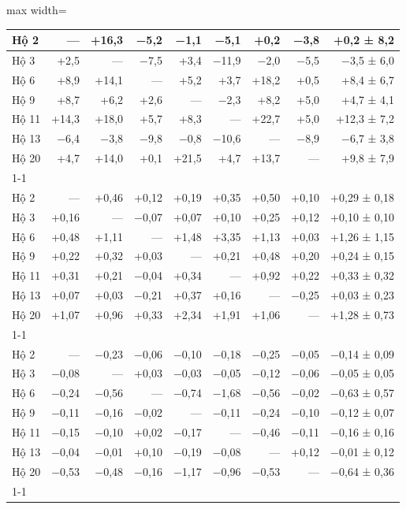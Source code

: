 \begin{table}[H]
\begin{adjustbox}{max width=\linewidth}
\begin{tabular}{|l|r|r|r|r|r|r|r|r|}
Hộ 2 & — & +16,3 & −5,2 & −1,1 & −5,1 & +0,2 & −3,8 & +0,2 ± 8,2 \\ \hline
Hộ 3 & +2,5 & — & −7,5 & +3,4 & −11,9 & −2,0 & −5,5 & −3,5 ± 6,0 \\ \hline
Hộ 6 & +8,9 & +14,1 & — & +5,2 & +3,7 & +18,2 & +0,5 & +8,4 ± 6,7 \\ \hline
Hộ 9 & +8,7 & +6,2 & +2,6 & — & −2,3 & +8,2 & +5,0 & +4,7 ± 4,1 \\ \hline
Hộ 11 & +14,3 & +18,0 & +5,7 & +8,3 & — & +22,7 & +5,0 & +12,3 ± 7,2 \\ \hline
Hộ 13 & −6,4 & −3,8 & −9,8 & −0,8 & −10,6 & — & −8,9 & −6,7 ± 3,8 \\ \hline
Hộ 20 & +4,7 & +14,0 & +0,1 & +21,5 & +4,7 & +13,7 & — & +9,8 ± 7,9 \\ \cline{1-1}
\multicolumn{9}{|l|}{\textbf{NEP ↓}} \\ \hline
Hộ 2 & — & +0,46 & +0,12 & +0,19 & +0,35 & +0,50 & +0,10 & +0,29 ± 0,18 \\ \hline
Hộ 3 & +0,16 & — & −0,07 & +0,07 & +0,10 & +0,25 & +0,12 & +0,10 ± 0,10 \\ \hline
Hộ 6 & +0,48 & +1,11 & — & +1,48 & +3,35 & +1,13 & +0,03 & +1,26 ± 1,15 \\ \hline
Hộ 9 & +0,22 & +0,32 & +0,03 & — & +0,21 & +0,48 & +0,20 & +0,24 ± 0,15 \\ \hline
Hộ 11 & +0,31 & +0,21 & −0,04 & +0,34 & — & +0,92 & +0,22 & +0,33 ± 0,32 \\ \hline
Hộ 13 & +0,07 & +0,03 & −0,21 & +0,37 & +0,16 & — & −0,25 & +0,03 ± 0,23 \\ \hline
Hộ 20 & +1,07 & +0,96 & +0,33 & +2,34 & +1,91 & +1,06 & — & +1,28 ± 0,73 \\ \cline{1-1}
\multicolumn{9}{|l|}{\textbf{TECA ↑}} \\ \hline
Hộ 2 & — & −0,23 & −0,06 & −0,10 & −0,18 & −0,25 & −0,05 & −0,14 ± 0,09 \\ \hline
Hộ 3 & −0,08 & — & +0,03 & −0,03 & −0,05 & −0,12 & −0,06 & −0,05 ± 0,05 \\ \hline
Hộ 6 & −0,24 & −0,56 & — & −0,74 & −1,68 & −0,56 & −0,02 & −0,63 ± 0,57 \\ \hline
Hộ 9 & −0,11 & −0,16 & −0,02 & — & −0,11 & −0,24 & −0,10 & −0,12 ± 0,07 \\ \hline
Hộ 11 & −0,15 & −0,10 & +0,02 & −0,17 & — & −0,46 & −0,11 & −0,16 ± 0,16 \\ \hline
Hộ 13 & −0,04 & −0,01 & +0,10 & −0,19 & −0,08 & — & +0,12 & −0,01 ± 0,12 \\ \hline
Hộ 20 & −0,53 & −0,48 & −0,16 & −1,17 & −0,96 & −0,53 & — & −0,64 ± 0,36 \\ \cline{1-1}

\end{tabular}
\end{adjustbox}
\end{table}
